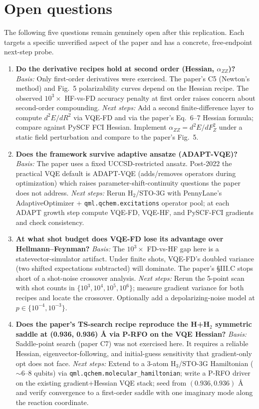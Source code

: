 \section{Open questions}\label{sec:oq}

The following five questions remain genuinely open after this replication. Each
targets a specific unverified aspect of the paper and has a concrete,
free-endpoint next-step probe.

\begin{enumerate}
\item \textbf{Do the derivative recipes hold at second order (Hessian, $\alpha_{ZZ}$)?}
  \emph{Basis:} Only first-order derivatives were exercised. The paper's C5
  (Newton's method) and Fig.\ 5 polarizability curves depend on the Hessian
  recipe. The observed $10^3\times$ HF-vs-FD accuracy penalty at first order
  raises concern about second-order compounding.
  \emph{Next steps:} Add a second finite-difference layer to compute
  $d^2 E / d R^2$ via VQE-FD and via the paper's Eq.\ 6--7 Hessian formula;
  compare against PySCF FCI Hessian. Implement $\alpha_{ZZ} = d^2 E / dF_Z^2$
  under a static field perturbation and compare to the paper's Fig.\ 5.

\item \textbf{Does the framework survive adaptive ansatze (ADAPT-VQE)?}
  \emph{Basis:} The paper uses a fixed UCCSD-restricted ansatz. Post-2022 the
  practical VQE default is ADAPT-VQE (adds/removes operators during
  optimization) which raises parameter-shift-continuity questions the paper
  does not address.
  \emph{Next steps:} Rerun H$_2$/STO-3G with PennyLane's AdaptiveOptimizer +
  \texttt{qml.qchem.excitations} operator pool; at each ADAPT growth step
  compute VQE-FD, VQE-HF, and PySCF-FCI gradients and check consistency.

\item \textbf{At what shot budget does VQE-FD lose its advantage over Hellmann--Feynman?}
  \emph{Basis:} The $10^3\times$ FD-vs-HF gap here is a statevector-simulator
  artifact. Under finite shots, VQE-FD's doubled variance (two shifted
  expectations subtracted) will dominate. The paper's \S III.C stops short of
  a shot-noise crossover analysis.
  \emph{Next steps:} Rerun the 5-point scan with shot counts in
  $\{10^3, 10^4, 10^5, 10^6\}$; measure gradient variance for both recipes and
  locate the crossover. Optionally add a depolarizing-noise model at
  $p \in \{10^{-4}, 10^{-3}\}$.

\item \textbf{Does the paper's TS-search recipe reproduce the H+H$_2$ symmetric saddle at (0.936, 0.936) \AA{} via P-RFO on the VQE Hessian?}
  \emph{Basis:} Saddle-point search (paper C7) was not exercised here. It
  requires a reliable Hessian, eigenvector-following, and initial-guess
  sensitivity that gradient-only opt does not face.
  \emph{Next steps:} Extend to a 3-atom H$_3$/STO-3G Hamiltonian
  ($\sim 6$--8 qubits) via \texttt{qml.qchem.molecular\_hamiltonian}; write a
  P-RFO driver on the existing gradient+Hessian VQE stack; seed from
  $(0.936, 0.936)$ \AA{} and verify convergence to a first-order saddle with
  one imaginary mode along the reaction coordinate.


\end{enumerate}

